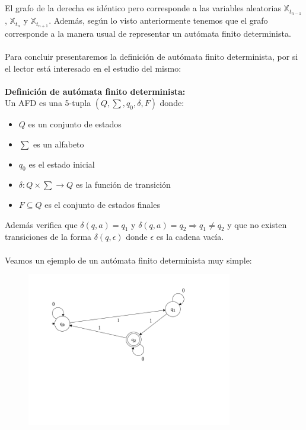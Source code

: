 \documentclass[12pt,a4paper]{article}
\begin{document}
\\\\
El grafo de la derecha es idéntico pero corresponde a las variables aleatorias $\mathbb{X}_{t_{n-1}}$, $\mathbb{X}_{t_n}$ y $\mathbb{X}_{t_{n+1}}$. Además, según lo visto anteriormente tenemos que el grafo corresponde a la manera usual de representar un autómata finito determinista.
\\\\
Para concluir presentaremos la definición de autómata finito determinista, por si el lector está interesado en el estudio del mismo:
\\\\
\textbf{Definición de autómata finito determinista:}
\\
Un AFD es una 5-tupla $(Q,\sum ,q_0,\delta,F)$ donde:
\begin{itemize}
\item $Q$ es un conjunto de estados
\item $\sum$ es un alfabeto
\item $q_0$ es el estado inicial
\item $\delta :Q\times\sum\rightarrow Q$ es la función de transición
\item $F\subseteq Q$ es el conjunto de estados finales
\end{itemize}
Además verifica que $\delta (q,a)=q_1$ y $\delta (q,a)=q_2 \Rightarrow q_1 \neq q_2$ y que no existen transiciones de la forma $\delta(q,\epsilon)$ donde $\epsilon$ es la cadena vacía.
\\\\
Veamos un ejemplo de un autómata finito determinista muy simple:
\begin{figure}[h]
  \centering
    \includegraphics[width=0.8\textwidth]{img/afd.png}
  \label{fig:ejemplo}
\end{figure}
\end{document}
